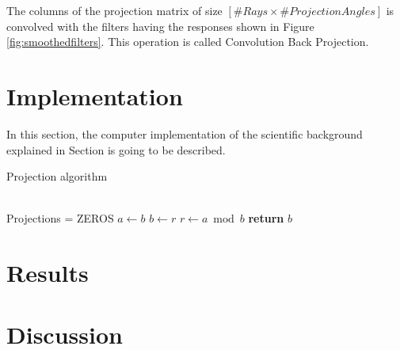\documentclass[journal]{IEEEtran}
\begin{document}
The columns of the projection matrix of size $[\#Rays \times \#Projection Angles]$ is convolved with the filters having the responses shown in Figure \ref{fig:smoothedfilters}. This operation is called Convolution Back Projection.

\section{Implementation} \label{sec:implementation}

In this section, the computer implementation of the scientific background explained in Section  is going to be described.

\begin{algorithm}[h]
	\caption{Projection algorithm}\label{euclid}
	\begin{algorithmic}
	 \\
	\State Projections = ZEROS
			\State $a\gets b$
			\State $b\gets r$
			\State $r\gets a\bmod b$
		  \EndFor
	   \EndFor\label{euclidendwhile}
	   \State \textbf{return} $b$
	\EndProcedure
	\end{algorithmic}
	\label{alg:projection}
\end{algorithm}

\section{Results} \label{sec:results}

\section{Discussion} \label{sec:discuss}

\printbibliography
\end{document}
